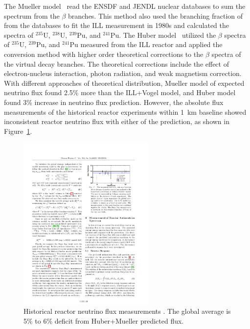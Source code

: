     The Mueller model~\cite{bib:mueller} read the ENSDF and JENDL nuclear databases to sum the \nuebar spectrum from the $\beta$ branches.
    This method also used the branching fraction of from the databases to fit the ILL measurement in 1980s and calculated the \nuebar spectra of $^{235}$U, $^{238}$U, $^{239}$Pu, and $^{241}$Pu.
    The Huber model~\cite{bib:huber} utilized the $\beta$ spectra of $^{235}$U, $^{239}$Pu, and $^{241}$Pu measured from the ILL reactor and applied the conversion method with higher order theoretical corrections to the $\beta$ spectra of the virtual decay branches.
    The theoretical corrections include the effect of electron-nucleus interaction, photon radiation, and weak magnetism correction. 
    With different approaches of theoretical distribution, Mueller model of expected neutrino flux found 2.5\% more than the ILL+Vogel model, and Huber model found 3\% increase in neutrino flux prediction.
    However, the absolute flux measurements of the historical reactor experiments within 1~km baseline showed inconsistent reactor neutrino flux with either of the prediction, as shown in Figure~\ref{fig:DYBFlux}.
    \begin{figure}[h!]
    \centering
    \includegraphics[width=0.6\textwidth]{Figures/DYBGlobalFlux.pdf}
    \caption[Daya Bay Absolute Reactor Neutrino Flux]{Historical reactor neutrino flux measurements \cite{bib:DYB2015}.
    The global average is 5\% to 6\% deficit from Huber+Mueller predicted flux.}
    \label{fig:DYBFlux}
    \end{figure}
    
